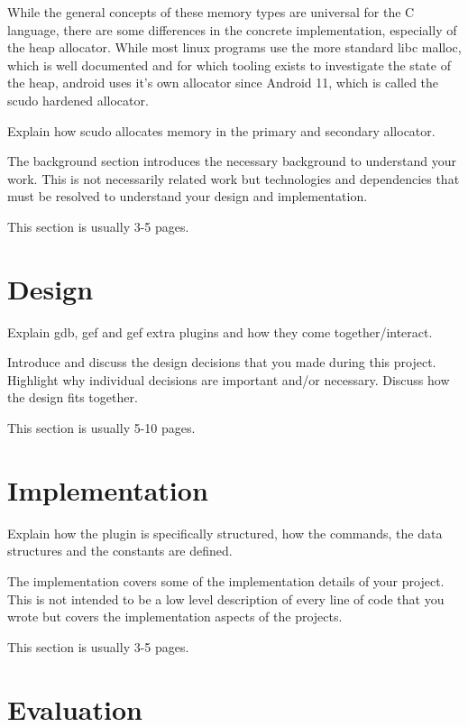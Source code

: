\documentclass[a4paper,11pt,oneside]{report}
\begin{document}
While the general concepts of these memory types are universal for the C language,
there are some differences in the concrete implementation, especially of the heap
allocator. While most linux programs use the more standard libc malloc, which is
well documented and for which tooling exists to investigate the state of the heap,
android uses it's own allocator since Android 11, which is called the scudo
hardened allocator.



Explain how scudo allocates memory in the primary and secondary allocator.

The background section introduces the necessary background to understand your
work. This is not necessarily related work but technologies and dependencies
that must be resolved to understand your design and implementation.

This section is usually 3-5 pages.


\chapter{Design}

Explain gdb, gef and gef extra plugins and how they come together/interact.

Introduce and discuss the design decisions that you made during this project.
Highlight why individual decisions are important and/or necessary. Discuss
how the design fits together.

This section is usually 5-10 pages.


\chapter{Implementation}

Explain how the plugin is specifically structured, how the commands, the data
structures and the constants are defined.



The implementation covers some of the implementation details of your project.
This is not intended to be a low level description of every line of code that
you wrote but covers the implementation aspects of the projects.

This section is usually 3-5 pages.


\chapter{Evaluation}
\end{document}
